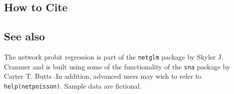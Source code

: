  \subsection* {How to Cite} 



\subsection* {See also}
The network probit regression is part of the {\tt netglm} package by Skyler J. Cranmer and is built using some of the functionality of the  {\tt sna} package by Carter T. Butts \citep{ButCar01}.In addition, advanced users may wish to refer to {\tt help(netpoisson)}. Sample data are fictional. 
